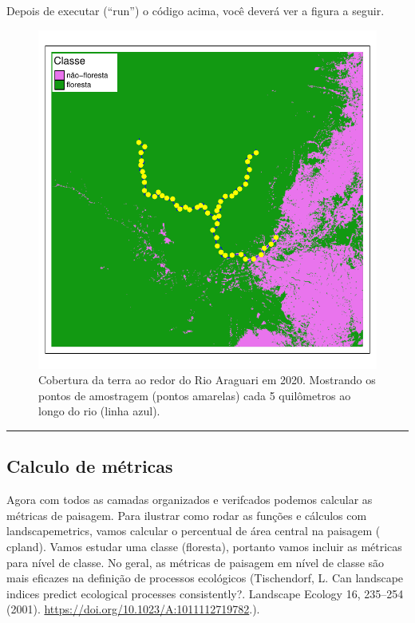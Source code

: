 \documentclass[
]{article}
\begin{document}
Depois de executar (``run'') o código acima, você deverá ver a figura a seguir.

\begin{figure}
\centering
\includegraphics{epr_files/figure-latex/unnamed-chunk-26-1.pdf}
\caption{\label{fig:unnamed-chunk-26}Cobertura da terra ao redor do Rio Araguari em 2020. Mostrando os pontos de amostragem (pontos amarelas) cada 5 quilômetros ao longo do rio (linha azul).}
\end{figure}

\begin{center}\rule{0.5\linewidth}{0.5pt}\end{center}

\newpage

\hypertarget{calculo-de-muxe9tricas}{%
\subsection{Calculo de métricas}\label{calculo-de-muxe9tricas}}

Agora com todos as camadas organizados e verifcados podemos calcular as métricas de paisagem. Para ilustrar como rodar as funções e cálculos com landscapemetrics, vamos calcular o percentual de área central na paisagem ( \colorbox[HTML]{dedede}{cpland}). Vamos estudar uma classe (floresta), portanto vamos incluir as métricas para nível de classe. No geral, as métricas de paisagem em nível de classe são mais eficazes na definição de processos ecológicos (Tischendorf, L. Can landscape indices predict ecological processes consistently?. Landscape Ecology 16, 235--254 (2001).
\url{https://doi.org/10.1023/A:1011112719782}.).
\end{document}
